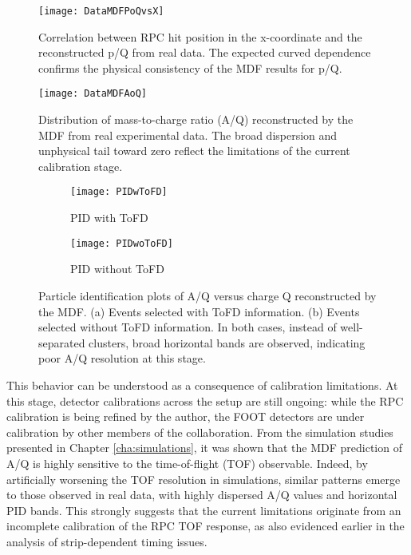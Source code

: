 \begin{figure}
	\centering
	\texttt{[image: DataMDFPoQvsX]}
	\caption[RPC x-position vs p/Q]{Correlation between \gls{RPC} hit position in the x-coordinate and the reconstructed p/Q from real data. The expected curved dependence confirms the physical consistency of the \gls{MDF} results for p/Q.}
	\label{fig:x_vs_PoQ}
\end{figure}


\begin{figure}
	\centering
	\texttt{[image: DataMDFAoQ]}
	\caption[Histogram of reconstructed A/Q]{Distribution of mass-to-charge ratio (A/Q) reconstructed by the \gls{MDF} from real experimental data. The broad dispersion and unphysical tail toward zero reflect the limitations of the current calibration stage.}
	\label{fig:AoQ_hist}
\end{figure}


\begin{figure}
	\centering
	\begin{subfigure}{.5\textwidth}
		\centering
		\texttt{[image: PIDwToFD]}
		\caption{PID with \gls{ToFD}}
		\label{fig:PIDWToFD}
	\end{subfigure}%
	\begin{subfigure}{.5\textwidth}
		\centering
		\texttt{[image: PIDwoToFD]}
		\caption{PID without \gls{ToFD}}
		\label{fig:PIDwoToFD}
	\end{subfigure}
	\caption[PID plots (A/Q vs Q) with and without ToFD]{Particle identification plots of A/Q versus charge Q reconstructed by the \gls{MDF}. (a) Events selected with \gls{ToFD} information. (b) Events selected without \gls{ToFD} information. In both cases, instead of well-separated clusters, broad horizontal bands are observed, indicating poor A/Q resolution at this stage.}
	\label{fig:PID_AoQ_vs_Q}
\end{figure}

This behavior can be understood as a consequence of calibration limitations. At this stage, detector calibrations across the setup are still ongoing: while the \gls{RPC} calibration is being refined by the author, the FOOT detectors are under calibration by other members of the collaboration. From the simulation studies presented in Chapter \ref{cha:simulations}, it was shown that the \gls{MDF} prediction of A/Q is highly sensitive to the time-of-flight (TOF) observable. Indeed, by artificially worsening the TOF resolution in simulations, similar patterns emerge to those observed in real data, with highly dispersed A/Q values and horizontal PID bands. This strongly suggests that the current limitations originate from an incomplete calibration of the \gls{RPC} TOF response, as also evidenced earlier in the analysis of strip-dependent timing issues.

